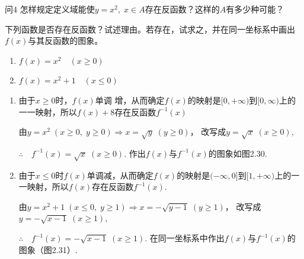 \begin{thm}{问4}
    怎样规定定义域能使$y=x^2,\; x\in A$存在反函数？这样的$A$有多少种可能？
\end{thm}

\begin{example}
    下列函数是否存在反函数？试述理由。若存在，试求之，并在同一坐标系中画出$f(x)$与其反函数的图象。
\begin{multicols}{2}
\begin{enumerate}[(1)]
    \item $f(x)=x^2\quad (x\ge 0)$
    \item $f(x)=x^2+1\quad (x\le 0)$
\end{enumerate}
\end{multicols}
\end{example}

\begin{solution}
\begin{enumerate}[(1)]
    \item 由于$x\ge 0$时，$f(x)$单调 增，从而确定$f(x)$的映射是$[0,+\infty)$到$[0,\infty)$上的一一映射，所以$f(x)+8$存在反函数$f^{-1}(x)$

    由$y=x^2\; (x\ge 0,\; y\ge 0)\Longrightarrow x=\sqrt{y}\; (y\ge 0)$，
    改写成$y=\sqrt{x}\; (x\ge 0)$,

$\therefore\quad     f^{-1}(x)=\sqrt{x}\; (x\ge 0)$. 作出$f(x)$与$f^{-1}(x)$的图象如图2.30.

\item 由于$x\le 0$时$f(x)$单调减，从而确定$f(x)$的映射是$(-\infty,0]$到$[1,+\infty)$上的一一映射，所以$f(x)$存在反函数$f^{-1}(x)$.

由$y=x^2+1\; (x\le 0,\; y\ge 1)\Longrightarrow x=-\sqrt{y-1}\; (y\ge 1)$，
改写成$y=-\sqrt{x-1}\; (x\ge 1)$,

$\therefore\quad     f^{-1}(x)=-\sqrt{x-1}\; (x\ge 1)$. 在同一坐标系中作出$f(x)$与$f^{-1}(x)$的图象（图2.31）.
\end{enumerate}
\end{solution}

